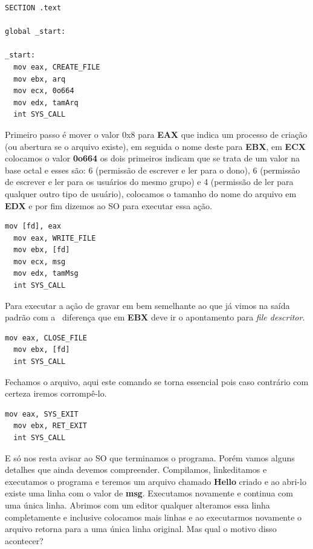 \begin{lstlisting}[]
SECTION .text

global _start:

_start:
  mov eax, CREATE_FILE
  mov ebx, arq
  mov ecx, 0o664
  mov edx, tamArq
  int SYS_CALL	
\end{lstlisting}	

Primeiro passo é mover o valor 0x8 para \textbf{EAX} que indica um processo de criação (ou abertura se o arquivo existe), em seguida o nome deste para \textbf{EBX}, em \textbf{ECX} colocamos o valor \textbf{0o664} os dois primeiros indicam que se trata de um valor na base octal e esses são: 6 (permissão de escrever e ler para o dono), 6 (permissão de escrever e ler para os usuários do mesmo grupo) e 4 (permissão de ler para qualquer outro tipo de usuário), colocamos o tamanho do nome do arquivo em \textbf{EDX} e por fim dizemos ao SO para executar essa ação.

\begin{lstlisting}[]
  mov [fd], eax  
  mov eax, WRITE_FILE
  mov ebx, [fd]
  mov ecx, msg
  mov edx, tamMsg
  int SYS_CALL	
\end{lstlisting}	

Para executar a ação de gravar em bem semelhante ao que já vimos na saída padrão com a ~diferença que em \textbf{EBX} deve ir o apontamento para \textit{file descritor}.

\begin{lstlisting}[]
  mov eax, CLOSE_FILE
  mov ebx, [fd]
  int SYS_CALL	
\end{lstlisting}	

Fechamos o arquivo, aqui este comando se torna essencial pois caso contrário com certeza iremos corrompê-lo.

\begin{lstlisting}[]
  mov eax, SYS_EXIT
  mov ebx, RET_EXIT
  int SYS_CALL	
\end{lstlisting}	

E só nos resta avisar ao SO que terminamos o programa. Porém vamos alguns detalhes que ainda devemos compreender. Compilamos, linkeditamos e executamos o programa e teremos um arquivo chamado \textbf{Hello} criado e ao abri-lo existe uma linha com o valor de \textbf{msg}. Executamos novamente e continua com uma única linha. Abrimos com um editor qualquer alteramos essa linha completamente e inclusive colocamos mais linhas e ao executarmos novamente o arquivo retorna para a uma única linha original. Mas qual o motivo disso acontecer?

